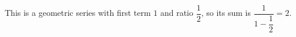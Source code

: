 This is a geometric series with first term $1$ and ratio $\dfrac12$, so its sum is $\dfrac{1}{1-\dfrac12}=\boxed{2}$.
